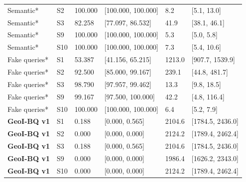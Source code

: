 \begin{longtable}{@{}P{2.5cm}P{.6cm}P{1.25cm}P{2.7cm}P{1.6cm}P{3.1cm}@{}}
Semantic* & S2 & 100.000 & [100.000, 100.000] & 8.2 & [5.1, 13.0] \\
Semantic* & S3 & 82.258 & [77.097, 86.532] & 41.9 & [38.1, 46.1] \\
Semantic* & S9 & 100.000 & [100.000, 100.000] & 5.3 & [5.0, 5.8] \\
Semantic* & S10 & 100.000 & [100.000, 100.000] & 7.3 & [5.4, 10.6] \\
Fake queries* & S1 & 53.387 & [41.156, 65.215] & 1213.0 & [907.7, 1539.9] \\
Fake queries* & S2 & 92.500 & [85.000, 99.167] & 239.1 & [44.8, 481.7] \\
Fake queries* & S3 & 98.790 & [97.957, 99.462] & 13.3 & [9.8, 18.5] \\
Fake queries* & S9 & 99.167 & [97.500, 100.000] & 42.2 & [4.8, 116.4] \\
Fake queries* & S10 & 100.000 & [100.000, 100.000] & 6.4 & [5.2, 7.9] \\
\textbf{GeoI-BQ v1} & S1 & 0.188 & [0.000, 0.565] & 2104.6 & [1784.5, 2436.0] \\
\textbf{GeoI-BQ v1} & S2 & 0.000 & [0.000, 0.000] & 2124.2 & [1789.4, 2462.4] \\
\textbf{GeoI-BQ v1} & S3 & 0.188 & [0.000, 0.565] & 2104.6 & [1784.5, 2436.0] \\
\textbf{GeoI-BQ v1} & S9 & 0.000 & [0.000, 0.000] & 1986.4 & [1626.2, 2343.0] \\
\textbf{GeoI-BQ v1} & S10 & 0.000 & [0.000, 0.000] & 2124.2 & [1789.4, 2462.4] \\
\end{longtable}

\endgroup
